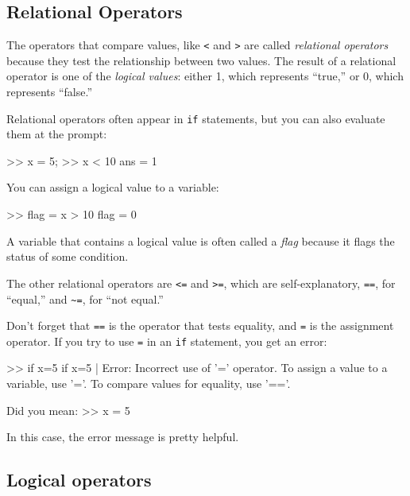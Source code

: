 

\subsection{Relational Operators}

The operators that compare values, like {\tt <} and {\tt >} are
called \emph{relational operators} because they test the relationship
between two values.  The result of a relational operator is one
of the \emph{logical values}:
either 1, which represents ``true,''  or 0, which represents ``false.''


Relational operators often appear in {\tt if} statements, but you can also evaluate them at the prompt:

\begin{code}
>> x = 5;
>> x < 10
ans = 1
\end{code}

You can assign a logical value to a variable:

\begin{code}
>> flag = x > 10
flag = 0
\end{code}

A variable that contains a logical value is often called a \emph{flag}
because it flags the status of some condition.


The other relational operators are {\tt <=} and {\tt >=}, which are
self-explanatory, {\tt ==}, for ``equal,'' and
\verb+~=+, for ``not equal.''

Don't forget that {\tt ==} is the operator that tests equality,
and {\tt =} is the assignment operator.  If you try to use {\tt =} in
an {\tt if} statement, you get an error:


\begin{code}
>> if x=5
 if x=5
     |
Error: Incorrect use of '=' operator. 
To assign a value to a variable, use '='.
To compare values for equality, use '=='.
 
Did you mean:
>> x = 5
\end{code}

In this case, the error message is pretty helpful.

\subsection{Logical operators}
\label{logop}

